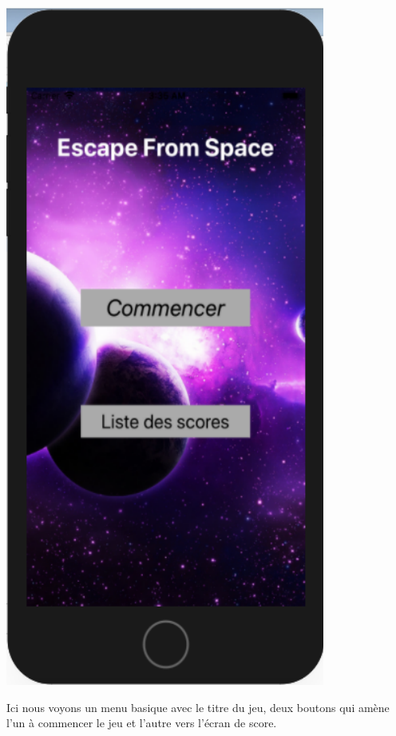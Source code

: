 \documentclass{article}
\begin{document}
   \begin{minipage}[c]{.46\linewidth}
    \begin{center}
            \includegraphics[scale=0.38]{MenuIOS.png}
        \end{center}
 \end{minipage}


Ici nous voyons un menu basique avec le titre du jeu, deux boutons qui amène l'un à commencer le jeu et l'autre vers l'écran de score.
\end{document}

